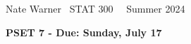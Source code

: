 \documentclass{report}
\title{\Huge{}}
\author{\huge{Nathan Warner}}
\date{\huge{}}
\begin{document}
 \pagebreak \bigbreak \noindent
 Nate Warner \ \quad \quad \quad \quad \quad \quad \quad \quad \quad \quad \quad \quad  STAT 300 \quad  \quad \quad \quad \quad \quad \quad \quad \quad \ \ \quad Summer 2024
 \begin{center}
     \textbf{PSET 7 - Due: Sunday, July 17}
 \end{center}
 \bigbreak \noindent 
\end{document}
